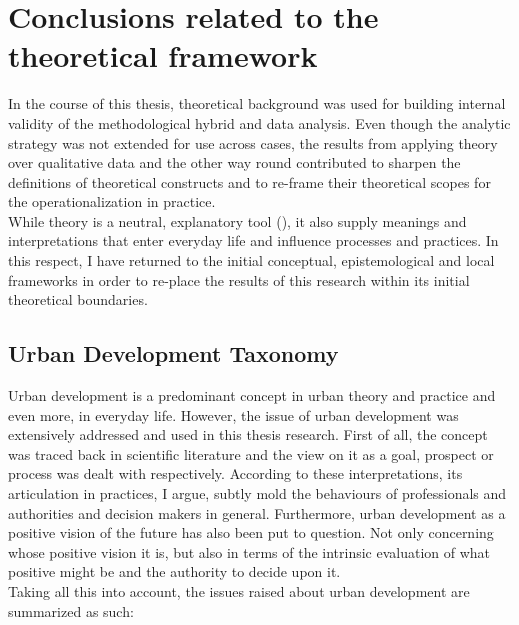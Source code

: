 \documentclass[11pt]{report}
\begin{document}
{\section{Conclusions related to the theoretical framework}

In the course of this thesis, theoretical background was used for building internal validity of the methodological hybrid and data analysis.
Even though the analytic strategy was not extended for use across cases, the results from applying theory over qualitative data and the other way round contributed to sharpen the definitions of theoretical constructs and to re-frame their theoretical scopes for the operationalization in practice.
\\

While theory is a neutral, explanatory tool (\href{Sears}{\citealt{Sears_good_2005}}), it also supply meanings and interpretations that enter everyday life and influence processes and practices.
In this respect, I have returned to the initial conceptual, epistemological and local frameworks in order to re-place the results of this research within its initial theoretical boundaries.

\subsection{Urban Development Taxonomy}

Urban development is a predominant concept in urban theory and practice and even more, in everyday life.
However, the issue of urban development was extensively addressed and used in this thesis research.
First of all, the concept was traced back in scientific literature and the view on it as a goal, prospect or process was dealt with respectively.
According to these interpretations, its articulation in practices, I argue, subtly mold the behaviours of professionals and authorities and decision makers in general.
Furthermore, urban development as a positive vision of the future has also been put to question.
Not only concerning whose positive vision it is, but also in terms of the intrinsic evaluation of what positive might be and the authority to decide upon it.
\\
Taking all this into account, the issues raised about urban development are summarized as such:

\begin{itemize}


\end{itemize}}
\end{document}
